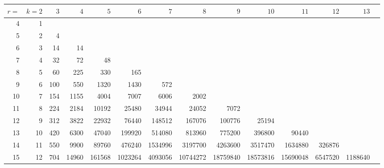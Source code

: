 \documentclass[11pt]{article}
\begin{document}
\vspace{0.7em}

\begin{center}
\renewcommand{\arraystretch}{1.05}
\setlength{\tabcolsep}{3pt}
\footnotesize
\begin{tabular}{|r|r|r|r|r|r|r|r|r|r|r|r|r|r|}
\hline
$r=$ & $k\!=\!2$ & $3$ & $4$ & $5$ & $6$ & $7$ & $8$ & $9$ & $10$ & $11$ & $12$ & $13$ & \\
\hline
4  & 1  &     &       &        &         &          &          &          &          &          &         &         & \\
5  & 2  & 4   &       &        &         &          &          &          &          &          &         &         & \\
6  & 3  & 14  & 14    &        &         &          &          &          &          &          &         &         & \\
7  & 4  & 32  & 72    & 48     &         &          &          &          &          &          &         &         & \\
8  & 5  & 60  & 225   & 330    & 165     &          &          &          &          &          &         &         & \\
9  & 6  & 100 & 550   & 1320   & 1430    & 572      &          &          &          &          &         &         & \\
10 & 7  & 154 & 1155  & 4004   & 7007    & 6006     & 2002     &          &          &          &         &         & \\
11 & 8  & 224 & 2184  & 10192  & 25480   & 34944    & 24052    & 7072     &          &          &         &         & \\
12 & 9  & 312 & 3822  & 22932  & 76440   & 148512   & 167076   & 100776   & 25194    &          &         &         & \\
13 & 10 & 420 & 6300  & 47040  & 199920  & 514080   & 813960   & 775200   & 396800   & 90440    &         &         & \\
14 & 11 & 550 & 9900  & 89760  & 476240  & 1534996  & 3197700  & 4263600  & 3517470  & 1634880  & 326876  &         & \\
15 & 12 & 704 & 14960 & 161568 & 1023264 & 4093056  & 10744272 & 18759840 & 18573816 & 15690048 & 6547520 & 1188640 & \\
\hline
\end{tabular}
\end{center}

\vspace{0.8em}
\end{document}
